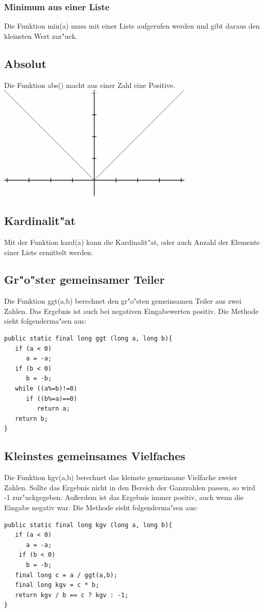 \documentclass{scrartcl}
\begin{document}
\subsubsection{Minimum aus einer Liste}
Die Funktion min(a) muss mit einer Liste aufgerufen werden und gibt daraus den kleinsten Wert zur"uck.
\subsection{Absolut}
Die Funktion abs() macht aus einer Zahl eine Positive.\newline
\includegraphics[width=0.7\textwidth]{images/functions/absolute.png}
\subsection{Kardinalit"at}
Mit der Funktion kard(a) kann die Kardinalit"at, oder auch Anzahl der Elemente einer Liste ermittelt werden.
\subsection{Gr"o"ster gemeinsamer Teiler}
Die  Funktion ggt(a,b) berechnet den gr"o"sten gemeinsamen Teiler aus zwei Zahlen. Das Ergebnis ist auch bei negativen Eingabewerten positiv. Die Methode sieht folgenderma"sen aus:\newline
\begin{minipage}{\textwidth}
\begin{lstlisting}
public static final long ggt (long a, long b){
   if (a < 0)
      a = -a;
   if (b < 0)
      b = -b;
   while ((a%=b)!=0)
      if ((b%=a)==0)
         return a;
   return b;
}
\end{lstlisting}
\end{minipage}
\subsection {Kleinstes gemeinsames Vielfaches}
Die Funktion kgv(a,b) berechnet das kleinste gemeinsame Vielfache zweier Zahlen. Sollte das Ergebnis nicht in den Bereich der Ganzzahlen passen, so wird -1 zur"uckgegeben. Au\ss{}erdem ist das Ergebnis immer positiv, auch wenn die Eingabe negativ war. Die Methode sieht folgenderma"sen aus:\newline
\begin{minipage}{\textwidth}
\begin{lstlisting}
public static final long kgv (long a, long b){
   if (a < 0)
      a = -a;
    if (b < 0)
      b = -b;
   final long c = a / ggt(a,b);
   final long kgv = c * b;
   return kgv / b == c ? kgv : -1;
}
\end{lstlisting}
\end{minipage}
\end{document}
